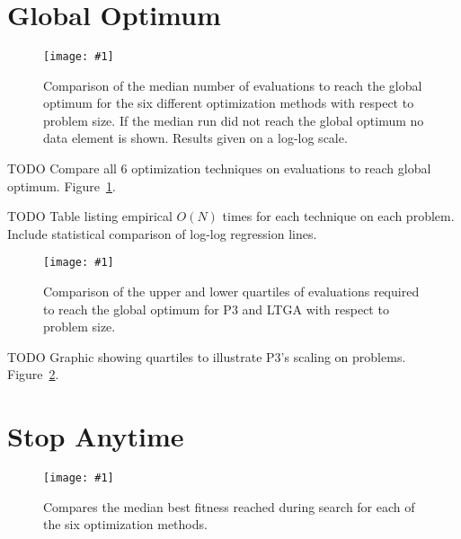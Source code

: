 \documentclass[twoside]{article}
\newcommand{\includegraphicsfit}[1]
{\texttt{[image: \#1]}}
\begin{document}
~\cite{goldman:2012:ltga} %

~\cite{goldman:2014:p3}

~\cite{jovanovic:1997:ruleofthree}

\section{Global Optimum}
\label{sec-optimum}

\begin{figure}[t]
  \begin{center}
  \includegraphicsfit{evals-to-success}
  \end{center}
  \caption{Comparison of the median number of evaluations to reach the global optimum for
           the six different optimization methods with respect
           to problem size.  If the median run did not reach the global optimum no data element
           is shown.  Results given on a log-log scale.}
  \label{fig-evals-to-success}
\end{figure}

TODO Compare all 6 optimization techniques on evaluations to reach global optimum.  Figure~\ref{fig-evals-to-success}.

TODO Table listing empirical $O(N)$ times for each technique on each problem. Include
statistical comparison of log-log regression lines.

\begin{figure}[t]
  \begin{center}
  \includegraphicsfit{evals-to-success-range}
  \end{center}
  \caption{Comparison of the upper and lower quartiles of evaluations required
           to reach the global optimum for P3 and LTGA with respect to problem size.}
  \label{fig-evals-to-success-range}
\end{figure}

TODO Graphic showing quartiles to illustrate P3's scaling on problems. Figure~\ref{fig-evals-to-success-range}.

\section{Stop Anytime}
\begin{figure}[t]
  \begin{center}
  \includegraphicsfit{fitness-over-time}
  \end{center}
  \caption{Compares the median best fitness reached during search for each of the six optimization methods.}
  \label{fig-fitness-over-time}
\end{figure}
\end{document}
